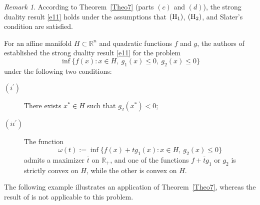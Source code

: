 \documentclass[]{interact}
\theoremstyle{plain}%
\theoremstyle{definition}
\theoremstyle{remark}
\newtheorem{remark}{Remark}
\begin{document}
	\begin{remark}
		According to Theorem~\ref{Theo7} (parts $(c)$ and $(d)$), the strong duality result \eqref{e11} holds under the assumptions that $({\rm H_1})$, $({\rm H_2})$, and Slater’s condition are satisfied. 
		
		For an affine manifold $H\subset \mathbb{R}^n$ and quadratic functions $f$ and $g$, the authors of \cite[Theorem~4]{TuyTuan2013} established the strong duality result \eqref{e11} for the problem
		\begin{equation}\label{e16} 
			\inf \{f(x): x\in H,\ g_1(x)\leq 0,\ g_2(x)\leq 0\}
		\end{equation}
		under the following two conditions:
		\begin{description}
			\item[$(i^\prime)$] There exists $x^*\in H$ such that $g_2(x^*)<0$;
			\item[$(ii^\prime)$] The function
			\[
			\omega(t):=\inf \{f(x)+tg_1(x): x\in H,\ g_2(x)\leq 0\}
			\]
			admits a maximizer $\bar t$ on $\mathbb{R}_+$, and one of the functions $f+\bar t g_1$ or $g_2$ is strictly convex on $H$, while the other is convex on $H$.
		\end{description}
		The following example illustrates an application of Theorem~\ref{Theo7}, whereas the result of \cite[Theorem~4]{TuyTuan2013} is not applicable to this problem.
	\end{remark}
	
\end{document}

